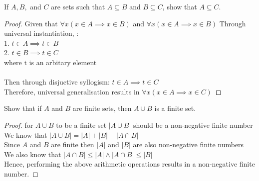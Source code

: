 \documentclass[a4paper]{exam}
\theoremstyle{definition}
\begin{document}
\begin{questions}
\question If $A, B,$ and $C$ are sets such that $A \subseteq B$ and $B \subseteq C$, show that $A \subseteq C$.

  \begin{solution}
    \begin{proof}
     Given that $\forall x (x \in A \implies x \in B)$ and $\forall x (x \in A \implies x \in B)$
     Through universal instantiation, :\\
  
      1. $t \in A \implies t \in B$\\
      2. $t \in B \implies t \in C$\\
      where t is an arbitary element\\\\

      Then through disjuctive syllogism: $t \in A \implies t \in C$\\
      Therefore, universal generalisation results in  $\forall x (x \in A \implies x \in C)$
  
    \end{proof}
  \end{solution}

\question Show that if $A$ and $B$ are finite sets, then  \( A \cup B \) is a finite set.

  \begin{solution}
    \begin{proof}
    for \(A \cup B\) to be a finite set \(|A \cup B|\) should be a non-negative finite number\\
    We know that \(|A \cup B| = |A| + |B| - |A \cap B|\)\\
    Since \(A\) and \(B\) are finite then \(|A|\) and \(|B|\) are also non-negative finite numbers\\
    We also know that \(|A \cap B| \leq |A| \land |A \cap B| \leq |B|\)\\
    Hence, performing the above arithmetic operations results in a non-negative finite number.  
    \end{proof}
  \end{solution}
  
\question
  \begin{parts}

\end{parts}
\end{questions}
\end{document}
